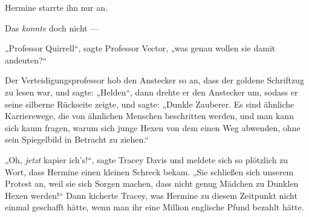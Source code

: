 Hermine starrte ihn nur an.

Das \emph{konnte} doch nicht —

„Professor Quirrell“, sagte Professor Vector, „was genau wollen sie damit andeuten?“

Der Verteidigungsprofessor hob den Anstecker so an, dass der goldene Schriftzug \SPHEW zu lesen war, und sagte:
„Helden“, dann drehte er den Anstecker um, sodass er seine silberne Rückseite zeigte, und sagte:
„Dunkle Zauberer. Es sind ähnliche Karrierewege, die von ähnlichen Menschen beschritten werden, und man kann sich kaum fragen, warum sich junge Hexen von dem einen Weg abwenden, ohne sein Spiegelbild in Betracht zu ziehen.“

„Oh, \emph{jetzt} kapier ich’s!“, sagte Tracey Davis und meldete sich so plötzlich zu Wort, dass Hermine einen kleinen Schreck bekam.
„Sie schließen sich unserem Protest an, weil sie sich Sorgen machen, dass nicht genug Mädchen zu Dunklen Hexen werden!“ Dann kicherte Tracey, was Hermine zu diesem Zeitpunkt nicht einmal geschafft hätte, wenn man ihr eine Million englische Pfund bezahlt hätte.

